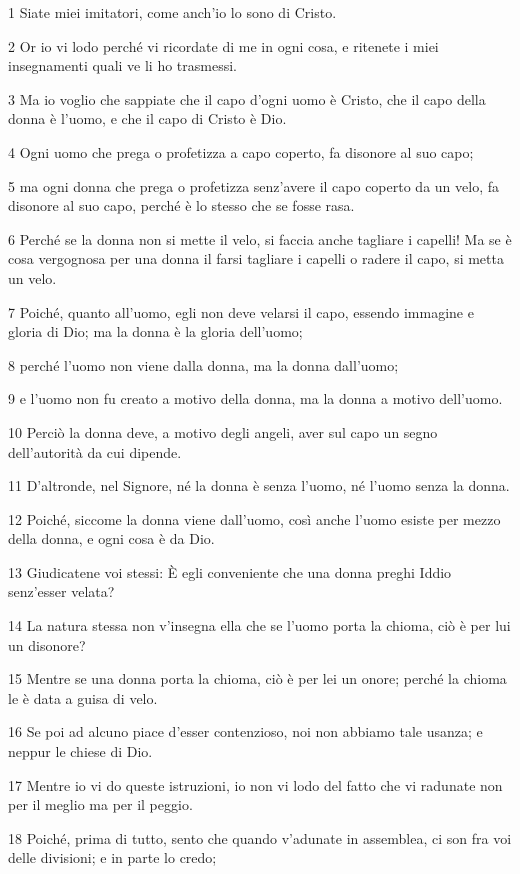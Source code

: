 \par 1 Siate miei imitatori, come anch'io lo sono di Cristo.
\par 2 Or io vi lodo perché vi ricordate di me in ogni cosa, e ritenete i miei insegnamenti quali ve li ho trasmessi.
\par 3 Ma io voglio che sappiate che il capo d'ogni uomo è Cristo, che il capo della donna è l'uomo, e che il capo di Cristo è Dio.
\par 4 Ogni uomo che prega o profetizza a capo coperto, fa disonore al suo capo;
\par 5 ma ogni donna che prega o profetizza senz'avere il capo coperto da un velo, fa disonore al suo capo, perché è lo stesso che se fosse rasa.
\par 6 Perché se la donna non si mette il velo, si faccia anche tagliare i capelli! Ma se è cosa vergognosa per una donna il farsi tagliare i capelli o radere il capo, si metta un velo.
\par 7 Poiché, quanto all'uomo, egli non deve velarsi il capo, essendo immagine e gloria di Dio; ma la donna è la gloria dell'uomo;
\par 8 perché l'uomo non viene dalla donna, ma la donna dall'uomo;
\par 9 e l'uomo non fu creato a motivo della donna, ma la donna a motivo dell'uomo.
\par 10 Perciò la donna deve, a motivo degli angeli, aver sul capo un segno dell'autorità da cui dipende.
\par 11 D'altronde, nel Signore, né la donna è senza l'uomo, né l'uomo senza la donna.
\par 12 Poiché, siccome la donna viene dall'uomo, così anche l'uomo esiste per mezzo della donna, e ogni cosa è da Dio.
\par 13 Giudicatene voi stessi: È egli conveniente che una donna preghi Iddio senz'esser velata?
\par 14 La natura stessa non v'insegna ella che se l'uomo porta la chioma, ciò è per lui un disonore?
\par 15 Mentre se una donna porta la chioma, ciò è per lei un onore; perché la chioma le è data a guisa di velo.
\par 16 Se poi ad alcuno piace d'esser contenzioso, noi non abbiamo tale usanza; e neppur le chiese di Dio.
\par 17 Mentre io vi do queste istruzioni, io non vi lodo del fatto che vi radunate non per il meglio ma per il peggio.
\par 18 Poiché, prima di tutto, sento che quando v'adunate in assemblea, ci son fra voi delle divisioni; e in parte lo credo;
